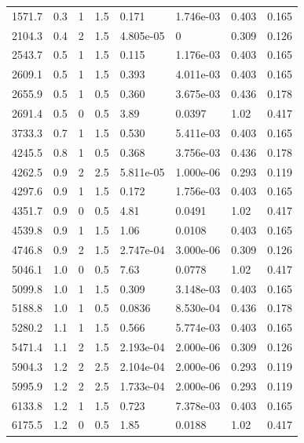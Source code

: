 \documentclass[preview]{standalone}
\begin{document}
{{\begin{tabular}{L{1.2cm}C{1.2cm} C{0.3cm}C{0.5cm} C{1.4cm}C{1.4cm} C{1.4cm}C{1.4cm}}
  1571.7  &   0.3  & 1     & 1.5 &  0.171  & 1.746e-03  & 0.403 &  0.165   \\ 
  2104.3  &   0.4  & 2     & 1.5 &  4.805e-05  & 0  & 0.309 &  0.126   \\ 
  2543.7  &   0.5  & 1     & 1.5 &  0.115  & 1.176e-03  & 0.403 &  0.165   \\ 
  2609.1  &   0.5  & 1     & 1.5 &  0.393  & 4.011e-03  & 0.403 &  0.165   \\ 
  2655.9  &   0.5  & 1     & 0.5 &  0.360  & 3.675e-03  & 0.436 &  0.178   \\ 
  2691.4  &   0.5  & 0     & 0.5 &  3.89  & 0.0397  & 1.02 &  0.417   \\ 
  3733.3  &   0.7  & 1     & 1.5 &  0.530  & 5.411e-03  & 0.403 &  0.165   \\ 
  4245.5  &   0.8  & 1     & 0.5 &  0.368  & 3.756e-03  & 0.436 &  0.178   \\ 
  4262.5  &   0.9  & 2     & 2.5 &  5.811e-05  & 1.000e-06  & 0.293 &  0.119   \\ 
  4297.6  &   0.9  & 1     & 1.5 &  0.172  & 1.756e-03  & 0.403 &  0.165   \\ 
  4351.7  &   0.9  & 0     & 0.5 &  4.81  & 0.0491  & 1.02 &  0.417   \\ 
  4539.8  &   0.9  & 1     & 1.5 &  1.06  & 0.0108  & 0.403 &  0.165   \\ 
  4746.8  &   0.9  & 2     & 1.5 &  2.747e-04  & 3.000e-06  & 0.309 &  0.126   \\ 
  5046.1  &   1.0  & 0     & 0.5 &  7.63  & 0.0778  & 1.02 &  0.417   \\ 
  5099.8  &   1.0  & 1     & 1.5 &  0.309  & 3.148e-03  & 0.403 &  0.165   \\ 
  5188.8  &   1.0  & 1     & 0.5 &  0.0836  & 8.530e-04  & 0.436 &  0.178   \\ 
  5280.2  &   1.1  & 1     & 1.5 &  0.566  & 5.774e-03  & 0.403 &  0.165   \\ 
  5471.4  &   1.1  & 2     & 1.5 &  2.193e-04  & 2.000e-06  & 0.309 &  0.126   \\ 
  5904.3  &   1.2  & 2     & 2.5 &  2.104e-04  & 2.000e-06  & 0.293 &  0.119   \\ 
  5995.9  &   1.2  & 2     & 2.5 &  1.733e-04  & 2.000e-06  & 0.293 &  0.119   \\ 
  6133.8  &   1.2  & 1     & 1.5 &  0.723  & 7.378e-03  & 0.403 &  0.165   \\ 
  6175.5  &   1.2  & 0     & 0.5 &  1.85  & 0.0188  & 1.02 &  0.417   \\ 

\end{tabular}}}
\end{document}
